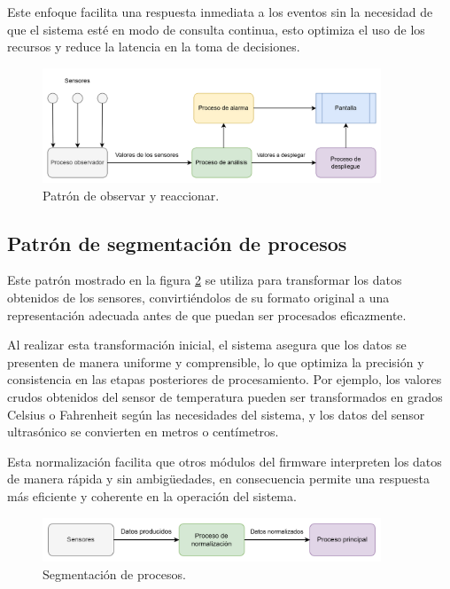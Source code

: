 Este enfoque facilita una respuesta inmediata a los eventos sin la necesidad de que el sistema esté en modo de consulta continua, esto optimiza el uso de los recursos y reduce la latencia en la toma de decisiones.

\vspace{1cm}
\begin{figure}[htbp]
	\centering
	\includegraphics[width=0.9\textwidth, height=0.25\textheight]{./Figures/patron_de_observar_y_reaccionar.png}
	\caption{Patrón de observar y reaccionar.}
	\label{fig:patron_de_observar_y_reaccionar}
\end{figure}
\vspace{1cm}

\newpage

\subsection{Patrón de segmentación de procesos}

Este patrón mostrado en la figura \ref{fig:segmentacion_de_procesos} se utiliza para transformar los datos obtenidos de los sensores, convirtiéndolos de su formato original a una representación adecuada antes de que puedan ser procesados eficazmente. 

Al realizar esta transformación inicial, el sistema asegura que los datos se presenten de manera uniforme y comprensible, lo que optimiza la precisión y consistencia en las etapas posteriores de procesamiento. Por ejemplo, los valores crudos obtenidos del sensor de temperatura pueden ser transformados en grados Celsius o Fahrenheit según las necesidades del sistema, y los datos del sensor ultrasónico se convierten en metros o centímetros. 

Esta normalización facilita que otros módulos del firmware interpreten los datos de manera rápida y sin ambigüedades, en consecuencia permite una respuesta más eficiente y coherente en la operación del sistema.

\vspace{1cm}
\begin{figure}[htbp]
	\centering
	\includegraphics[width=0.9\textwidth, height=0.1\textheight]{./Figures/segmentacion_de_procesos.png}
	\caption{Segmentación de procesos.}
	\label{fig:segmentacion_de_procesos}
\end{figure}
\vspace{1cm}

